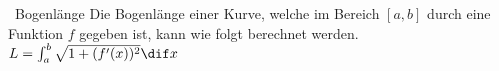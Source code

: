 \begin{theorem}{~Bogenlänge}
	Die Bogenlänge einer Kurve, welche im Bereich $[a,b]$ durch eine Funktion $f$ gegeben ist, kann wie folgt berechnet werden.
	\\$L = \int_{a}^{b} \sqrt{1 + ( f'(x) )^2} \dif x$	
\end{theorem}
